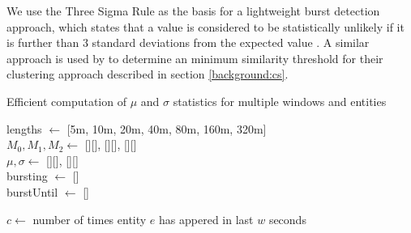 We use the Three Sigma Rule as the basis for a lightweight burst detection approach, which states that a value is considered to be statistically unlikely if it is further than 3 standard deviations from the expected value \citep{Pukelsheim94}.
A similar approach is used by \cite{Aggarwal12} to determine an minimum similarity threshold for their clustering approach described in section \ref{background:cs}.

\begin{algorithm}[t]
	\caption{Efficient computation of $\mu$ and $\sigma$ statistics for multiple windows and entities}
	\label{detection:alg:updatingEntityValues}

	\DontPrintSemicolon

	lengths $\gets$ [5m, 10m, 20m, 40m, 80m, 160m, 320m]\\
	$M_0, M_1, M_2 \gets$ [][], [][], [][] \\
	$\mu, \sigma \gets$ [][], [][] \\
	bursting $\gets$ [] \\
	burstUntil $\gets$ [] \\

	 {

		 {


			 {
				$c \gets$ number of times entity $e$ has appered in last $w$ seconds \\

			}

		}
	}
\end{algorithm}

